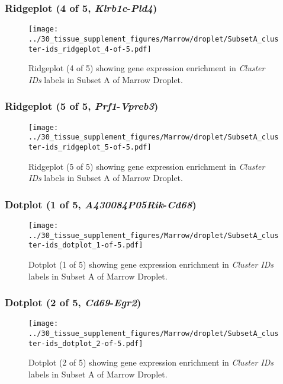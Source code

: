 \clearpage

\subsubsection{Ridgeplot (4 of 5, \emph{Klrb1c}-\emph{Pld4})}
\begin{figure}[h]
\centering
\texttt{[image: ../30\_tissue\_supplement\_figures/Marrow/droplet/SubsetA\_cluster-ids\_ridgeplot\_4-of-5.pdf]}

\caption{ Ridgeplot (4 of 5)  showing gene expression enrichment in \emph{Cluster IDs} labels in Subset A of Marrow Droplet. }
\end{figure}


\clearpage

\subsubsection{Ridgeplot (5 of 5, \emph{Prf1}-\emph{Vpreb3})}
\begin{figure}[h]
\centering
\texttt{[image: ../30\_tissue\_supplement\_figures/Marrow/droplet/SubsetA\_cluster-ids\_ridgeplot\_5-of-5.pdf]}

\caption{ Ridgeplot (5 of 5)  showing gene expression enrichment in \emph{Cluster IDs} labels in Subset A of Marrow Droplet. }
\end{figure}


\clearpage

\subsubsection{Dotplot (1 of 5, \emph{A430084P05Rik}-\emph{Cd68})}
\begin{figure}[h]
\centering
\texttt{[image: ../30\_tissue\_supplement\_figures/Marrow/droplet/SubsetA\_cluster-ids\_dotplot\_1-of-5.pdf]}

\caption{ Dotplot (1 of 5)  showing gene expression enrichment in \emph{Cluster IDs} labels in Subset A of Marrow Droplet. }
\end{figure}


\clearpage

\subsubsection{Dotplot (2 of 5, \emph{Cd69}-\emph{Egr2})}
\begin{figure}[h]
\centering
\texttt{[image: ../30\_tissue\_supplement\_figures/Marrow/droplet/SubsetA\_cluster-ids\_dotplot\_2-of-5.pdf]}

\caption{ Dotplot (2 of 5)  showing gene expression enrichment in \emph{Cluster IDs} labels in Subset A of Marrow Droplet. }
\end{figure}


